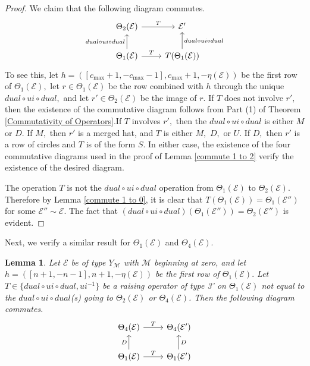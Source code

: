 \documentclass[11pt,letterpaper]{amsart}
\newcommand{\EE}{\mathcal{E}}
\newtheorem{lemma}[thm]{Lemma}
\numberwithin{equation}{section}
\begin{document}
\begin{proof}
    We claim that the following diagram commutes.
    \[\begin{tikzcd}
	{\Theta_2(\EE)} & {\EE'} \\
	{\Theta_1(\EE)} & {T(\Theta_1(\EE))}
	\arrow["T", from=1-1, to=1-2]
	\arrow["{dual \circ ui \circ dual}", from=2-1, to=1-1]
	\arrow["T", from=2-1, to=2-2]
	\arrow["{dual \circ ui \circ dual}"', from=2-2, to=1-2]
\end{tikzcd}\]
    To see this, let $h = ([c_{\max} + 1, -c_{\max} - 1], c_{\max} + 1, -\eta(\EE))$ be the first row of $\Theta_1(\EE),$ let $r \in \Theta_1(\EE)$ be the row combined with $h$ through the unique $dual \circ ui \circ dual,$ and let $r' \in \Theta_2(\EE)$ be the image of $r.$ If $T$ does not involve $r',$ then the existence of the commutative diagram follows from Part (1) of Theorem \ref{Commutativity of Operators}.If $T$ involves $r',$ then the $dual \circ ui \circ dual$ is either $M$ or $D.$ If $M,$ then $r'$ is a merged hat, and $T$ is either $M,$ $D,$ or $U.$ If $D,$ then $r'$ is a row of circles and $T$ is of the form $S.$ In either case, the existence of the four commutative diagrams used in the proof of Lemma \ref{commute 1 to 2} verify the existence of the desired diagram.

    The operation $T$ is not the $dual \circ ui \circ dual$ operation from $\Theta_1(\mathcal{E})$ to $\Theta_2(\mathcal{E}).$ Therefore by Lemma \ref{commute 1 to 0}, it is clear that $T(\Theta_1(\mathcal{E})) = \Theta_1(\mathcal{E}'')$ for some $\mathcal{E}'' \sim \mathcal{E}.$ The fact that $(dual \circ ui \circ dual)(\Theta_1(\mathcal{E}'')) = \Theta_2(\mathcal{E}'')$ is evident.
\end{proof}

Next, we verify a similar result for $\Theta_1(\EE)$ and $\Theta_4(\EE).$

\begin{lemma}
\label{commute 1 to 4}
    Let $\EE$ be of type $Y_\mathcal{M}$ with $\mathcal{M}$ beginning at zero, and let $h = ([n + 1, -n - 1], n + 1, -\eta(\EE))$ be the first row of $\Theta_1(\EE).$ Let $T \in \{dual \circ ui \circ dual, ui^{-1}\}$ be a raising operator of type 3' on $\Theta_1(\EE)$ not equal to the $dual \circ ui \circ dual$(s) going to $\Theta_2(\EE)$ or $\Theta_4(\EE)$. Then the following diagram commutes.
    \[\begin{tikzcd}
	{\Theta_4(\EE)} & {\Theta_4(\EE')} \\
	{\Theta_1(\EE)} & {\Theta_1(\EE')}
	\arrow["T", from=1-1, to=1-2]
	\arrow["{D}", from=2-1, to=1-1]
	\arrow["T", from=2-1, to=2-2]
	\arrow["{D}"', from=2-2, to=1-2]
\end{tikzcd}\]
\end{lemma}
\end{document}
